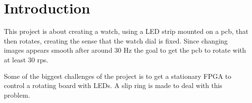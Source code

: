 \section{Introduction}
This project is about creating a watch, using a LED strip mounted on a pcb, that then rotates, creating the sense that the watch dial is fixed. 
Since changing images appears smooth after around 30 Hz \cite{article:rpm} the goal to get the pcb to rotate with at least 30 rps.

Some of the biggest challenges of the project is to get a stationary FPGA to control a rotating board with LEDs.
A slip ring is made to deal with this problem.